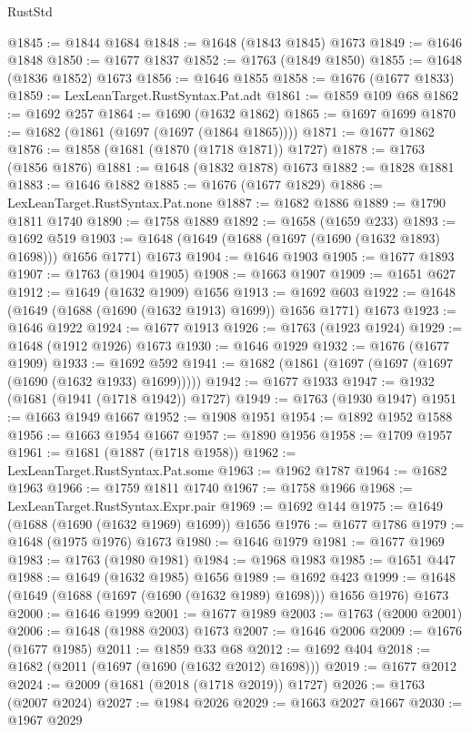 \begin{lexlean}{RustStd}
\begin{coremodule}
{\begin{coremodule}
{{{{{{{{{{{{{{{{{{{{{{{{{{{{{{{{{{{{{{{{{{{{@1845 := @1844 @1684
@1848 := @1648 (@1843 @1845) @1673
@1849 := @1646 @1848
@1850 := @1677 @1837
@1852 := @1763 (@1849 @1850)
@1855 := @1648 (@1836 @1852) @1673
@1856 := @1646 @1855
@1858 := @1676 (@1677 @1833)
@1859 := LexLeanTarget.RustSyntax.Pat.adt
@1861 := @1859 @109 @68
@1862 := @1692 @257
@1864 := @1690 (@1632 @1862)
@1865 := @1697 @1699
@1870 := @1682 (@1861 (@1697 (@1697 (@1864 @1865))))
@1871 := @1677 @1862
@1876 := @1858 (@1681 (@1870 (@1718 @1871)) @1727)
@1878 := @1763 (@1856 @1876)
@1881 := @1648 (@1832 @1878) @1673
@1882 := @1828 @1881
@1883 := @1646 @1882
@1885 := @1676 (@1677 @1829)
@1886 := LexLeanTarget.RustSyntax.Pat.none
@1887 := @1682 @1886
@1889 := @1790 @1811 @1740
@1890 := @1758 @1889
@1892 := @1658 (@1659 @233)
@1893 := @1692 @519
@1903 := @1648 (@1649 (@1688 (@1697 (@1690 (@1632 @1893) @1698))) @1656 @1771) @1673
@1904 := @1646 @1903
@1905 := @1677 @1893
@1907 := @1763 (@1904 @1905)
@1908 := @1663 @1907
@1909 := @1651 @627
@1912 := @1649 (@1632 @1909) @1656
@1913 := @1692 @603
@1922 := @1648 (@1649 (@1688 (@1690 (@1632 @1913) @1699)) @1656 @1771) @1673
@1923 := @1646 @1922
@1924 := @1677 @1913
@1926 := @1763 (@1923 @1924)
@1929 := @1648 (@1912 @1926) @1673
@1930 := @1646 @1929
@1932 := @1676 (@1677 @1909)
@1933 := @1692 @592
@1941 := @1682 (@1861 (@1697 (@1697 (@1697 (@1690 (@1632 @1933) @1699)))))
@1942 := @1677 @1933
@1947 := @1932 (@1681 (@1941 (@1718 @1942)) @1727)
@1949 := @1763 (@1930 @1947)
@1951 := @1663 @1949 @1667
@1952 := @1908 @1951
@1954 := @1892 @1952 @1588
@1956 := @1663 @1954 @1667
@1957 := @1890 @1956
@1958 := @1709 @1957
@1961 := @1681 (@1887 (@1718 @1958))
@1962 := LexLeanTarget.RustSyntax.Pat.some
@1963 := @1962 @1787
@1964 := @1682 @1963
@1966 := @1759 @1811 @1740
@1967 := @1758 @1966
@1968 := LexLeanTarget.RustSyntax.Expr.pair
@1969 := @1692 @144
@1975 := @1649 (@1688 (@1690 (@1632 @1969) @1699)) @1656
@1976 := @1677 @1786
@1979 := @1648 (@1975 @1976) @1673
@1980 := @1646 @1979
@1981 := @1677 @1969
@1983 := @1763 (@1980 @1981)
@1984 := @1968 @1983
@1985 := @1651 @447
@1988 := @1649 (@1632 @1985) @1656
@1989 := @1692 @423
@1999 := @1648 (@1649 (@1688 (@1697 (@1690 (@1632 @1989) @1698))) @1656 @1976) @1673
@2000 := @1646 @1999
@2001 := @1677 @1989
@2003 := @1763 (@2000 @2001)
@2006 := @1648 (@1988 @2003) @1673
@2007 := @1646 @2006
@2009 := @1676 (@1677 @1985)
@2011 := @1859 @33 @68
@2012 := @1692 @404
@2018 := @1682 (@2011 (@1697 (@1690 (@1632 @2012) @1698)))
@2019 := @1677 @2012
@2024 := @2009 (@1681 (@2018 (@1718 @2019)) @1727)
@2026 := @1763 (@2007 @2024)
@2027 := @1984 @2026
@2029 := @1663 @2027 @1667
@2030 := @1967 @2029
}}}}}}}}}}}}}}}}}}}}}}}}}}}}}}}}}}}}}}}}}}}}
\end{coremodule}}
\end{coremodule}
\end{lexlean}

